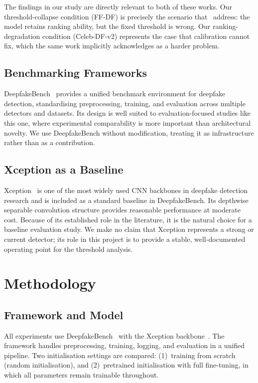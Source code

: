\documentclass[a4paper,12pt]{report}
\begin{document}
The findings in our study are directly relevant to both
of these works.
Our threshold-collapse condition (FF-DF) is precisely the
scenario that~\cite{aigicalib2025} address: the model
retains ranking ability, but the fixed threshold is wrong.
Our ranking-degradation condition (Celeb-DF-v2) represents
the case that calibration cannot fix, which the same
work implicitly acknowledges as a harder problem.

\section{Benchmarking Frameworks}

DeepfakeBench~\cite{deepfakebench} provides a unified
benchmark environment for deepfake detection, standardising
preprocessing, training, and evaluation across multiple
detectors and datasets.
Its design is well suited to evaluation-focused studies
like this one, where experimental comparability is more
important than architectural novelty.
We use DeepfakeBench without modification, treating it as
infrastructure rather than as a contribution.

\section{Xception as a Baseline}

Xception~\cite{chollet2017} is one of the most widely used
CNN backbones in deepfake detection research and is
included as a standard baseline in DeepfakeBench.
Its depthwise separable convolution structure provides
reasonable performance at moderate cost.
Because of its established role in the literature,
it is the natural choice for a baseline evaluation study.
We make no claim that Xception represents a strong or
current detector; its role in this project is to provide
a stable, well-documented operating point for the
threshold analysis.

\chapter{Methodology}

\section{Framework and Model}

All experiments use DeepfakeBench~\cite{deepfakebench}
with the Xception backbone~\cite{chollet2017}.
The framework handles preprocessing, training, logging,
and evaluation in a unified pipeline.
Two initialisation settings are compared:
(1)~training from scratch (random initialisation), and
(2)~pretrained initialisation with full fine-tuning,
in which all parameters remain trainable throughout.
\end{document}
